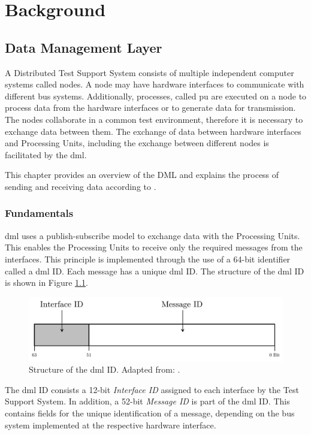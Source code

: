 
\chapter{Background}

\section{Data Management Layer} \label{chap:DML}
A Distributed Test Support System consists of multiple independent computer systems called nodes. A node may have hardware interfaces to communicate with different bus systems. Additionally, processes, called \ac{pu} are executed on a node to process data from the hardware interfaces or to generate data for transmission. The nodes collaborate in a common test environment, therefore it is necessary to exchange data between them. The exchange of data between hardware interfaces and Processing Units, including the exchange between different nodes is facilitated by the \ac{dml}.

This chapter provides an overview of the DML and explains the process of sending and receiving data according to \cite{dml01}.

\subsection{Fundamentals}
\ac{dml} uses a publish-subscribe model to exchange data with the Processing Units. This enables the Processing Units to receive only the required messages from the interfaces. This principle is implemented through the use of a 64-bit identifier called a \ac{dml} ID. Each message has a unique \ac{dml} ID.  The structure of the \ac{dml} ID is shown in Figure \ref{fig:DmlId}.

\begin{figure}[h!]
    \centering
    \includegraphics[width=0.8\linewidth]{figures/dml/dml01.pdf}
    \caption[Structure of the DML ID]{Structure of the \ac{dml} ID. Adapted from: \cite{dml01}.}
    \label{fig:DmlId}
\end{figure}

The \ac{dml} ID consists a 12-bit \textit{Interface ID} assigned to each interface by the Test Support System. In addition, a 52-bit \textit{Message ID} is part of the \ac{dml} ID. This contains fields for the unique identification of a message, depending on the bus system implemented at the respective hardware interface.

